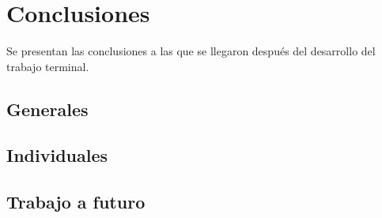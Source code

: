 \chapter{Conclusiones}

Se presentan las conclusiones a las que se llegaron después del desarrollo del trabajo terminal.

\section{Generales}

\section{Individuales}


\section{Trabajo a futuro}



